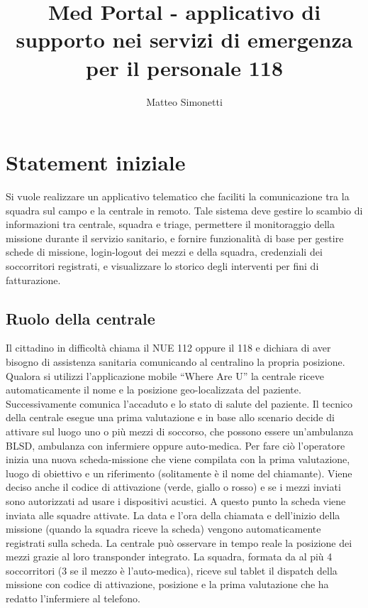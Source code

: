 \documentclass{article}
\title{Med Portal - applicativo di supporto nei servizi di emergenza per il personale 118}
\author{Matteo Simonetti}
\date{}
\begin{document}
    \maketitle

    \section{Statement iniziale}

    Si vuole realizzare un applicativo telematico che faciliti la comunicazione tra la squadra sul campo e la centrale in remoto. Tale sistema deve gestire lo scambio di informazioni tra centrale, squadra e triage, permettere il monitoraggio della missione durante il servizio sanitario, e fornire funzionalità di base per gestire schede di missione, login-logout dei mezzi e della squadra, credenziali dei soccorritori registrati, e visualizzare lo storico degli interventi per fini di fatturazione.

    \subsection{Ruolo della centrale}
    Il cittadino in difficoltà chiama il NUE 112 oppure il 118 e dichiara di aver bisogno di assistenza sanitaria comunicando al centralino la propria posizione. Qualora si utilizzi l’applicazione mobile “Where Are U” la centrale riceve automaticamente il nome e la posizione geo-localizzata del paziente. Successivamente comunica l’accaduto e lo stato di salute del paziente. Il tecnico della centrale esegue una prima valutazione e in base allo scenario decide di attivare sul luogo uno o più mezzi di soccorso, che possono essere un’ambulanza BLSD, ambulanza con infermiere oppure auto-medica. Per fare ciò l’operatore inizia una nuova scheda-missione che viene compilata con la prima valutazione, luogo di obiettivo e un riferimento (solitamente è il nome del chiamante). Viene deciso anche il codice di attivazione (verde, giallo o rosso) e se i mezzi inviati sono autorizzati ad usare i dispositivi acustici.
    A questo punto la scheda viene inviata alle squadre attivate.
    La data e l’ora della chiamata e dell’inizio della missione (quando la squadra riceve la scheda) vengono automaticamente registrati sulla scheda.
    La centrale può osservare in tempo reale la posizione dei mezzi grazie al loro transponder integrato.
    La squadra, formata da al più 4 soccorritori (3 se il mezzo è l’auto-medica), riceve sul tablet il dispatch della missione con codice di attivazione, posizione e la prima valutazione che ha redatto l’infermiere al telefono.
\end{document}
